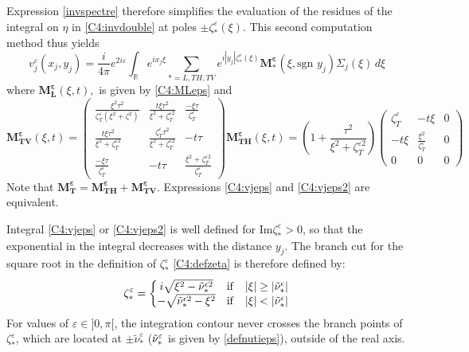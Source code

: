 Expression \eqref{invspectre} therefore simplifies the evaluation of the residues of the integral on $\eta$ in \eqref{C4:invdouble} at poles $\pm \zeta^{\varepsilon}_*(\xi)$. This second computation method thus yields
\begin{equation}
v_j^{\varepsilon}(x_j,y_j)=\frac{i}{4\pi}e^{2i\varepsilon}\int_{\mathbb{R}} e^{ix_j\xi}\sum_{*=L,TH,TV}e^{i|y_j|\zeta_*^{\varepsilon}(\xi)}\mathbf{M_*^{\varepsilon}}(\xi,\mbox{sgn }y_j)\Sigma_j(\xi)\,d\xi
\label{C4:vjeps2}
\end{equation}
where $\mathbf{M_L^{\varepsilon}}(\xi,t),$ is given by \eqref{C4:MLeps} and
\begin{subequations}
\begin{equation}
\mathbf{M_{TV}^{\varepsilon}}(\xi,t)=\begin{pmatrix}
\frac{\xi^2\tau^2}{\zeta_T^{\varepsilon}(\xi^2+\zeta^2)}&\frac{t\xi\tau^2}{\xi^2+\zeta_T^{\varepsilon 2}}&\frac{-\xi\tau}{\zeta_T^{\varepsilon}}\\
\frac{t\xi\tau^2}{\xi^2+\zeta_T^{\varepsilon 2}}&\frac{\zeta_T^{\varepsilon}\tau^2}{\xi^2+\zeta_T^{\varepsilon 2}}&-t\tau\\
\frac{-\xi\tau}{\zeta_T^{\varepsilon}}&-t\tau&\frac{\xi^2+\zeta_T^{\varepsilon 2}}{\zeta_T^{\varepsilon}}
\end{pmatrix}
\label{C4:MTVeps}
\end{equation}
\begin{equation}
\mathbf{M_{TH}^{\varepsilon}}(\xi,t)=\left(1+\frac{\tau^2}{\xi^2+\zeta_T^{\varepsilon 2}}\right)\begin{pmatrix}
\zeta_T^{\varepsilon}&-t\xi&0\\
-t\xi&\frac{\xi^2}{\zeta_T^{\varepsilon}}&0\\
0&0&0
\end{pmatrix}
\label{C4:MTHeps}
\end{equation}
\label{C4:M*eps2}
\end{subequations}
Note that $ \mathbf{M_T^{\varepsilon}}=\mathbf{M_{TH}^{\varepsilon}}+\mathbf{M_{TV}^{\varepsilon}}$. Expressions \eqref{C4:vjeps} and \eqref{C4:vjeps2} are equivalent.

Integral \eqref{C4:vjeps} or \eqref{C4:vjeps2} is well defined for Im$\zeta_*^{\varepsilon}>0$, so that the exponential in the integral decreases with the distance $y_j$. The branch cut for the square root in the definition of $\zeta_*^{\varepsilon}$ \eqref{C4:defzeta} is therefore defined by:
\begin{equation}
\zeta_*^{\varepsilon}=\left\{
\begin{matrix}
i \sqrt{\xi^2-\tilde{\nu}_*^{\epsilon 2}} & \rm if & |\xi|\geq |\tilde{\nu}_*^{\epsilon}|
\\
-\sqrt{\tilde{\nu}_*^{\epsilon 2}-\xi^2} & \rm if & |\xi|< |\tilde{\nu}_*^{\epsilon}|
\end{matrix}
\right.
\label{C4:zetabranchcut}
\end{equation}
For values of $\varepsilon \in \rbrack 0, \pi \lbrack $, the integration contour never crosses the branch points of $\zeta_*^{\varepsilon}$, which are located at $\pm \tilde{\nu}_*^{\varepsilon}$ ($\tilde{\nu}_*^{\varepsilon}$ is given by \eqref{defnutieps}), outside of the real axis.

